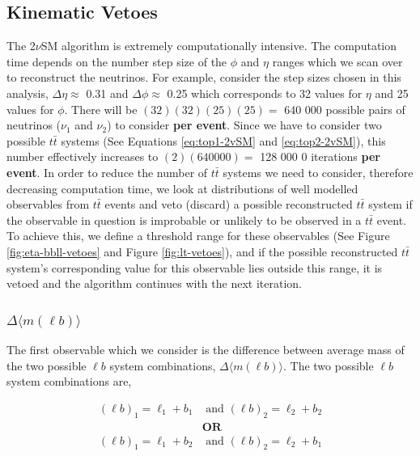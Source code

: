 \subsection{Kinematic Vetoes}
The 2$\nu$SM algorithm is extremely computationally intensive. The computation time depends on the number step size of the $\phi$ and $\eta$ ranges which we scan over to reconstruct the neutrinos. For example, consider the step sizes chosen in this analysis, $\Delta \eta \approx$ 0.31 and $\Delta \phi \approx$ 0.25 which corresponds to 32 values for $\eta$ and 25 values for $\phi$. There will be $(32)(32)(25)(25) = $ 640 000 possible pairs of neutrinos ($\nu_{1}$ and $\nu_{2}$) to consider \textbf{per event}. Since we have to consider two possible $t\bar{t}$ systems (See Equations \ref{eq:top1-2vSM} and \ref{eq:top2-2vSM}), this number effectively increases to $(2)(640000) = $ 128 000 0 iterations \textbf{per event}. In order to reduce the number of $t\bar{t}$ systems we need to consider, therefore decreasing computation time, we look at distributions of well modelled observables from $t\bar{t}$ events and veto (discard) a possible reconstructed $t\bar{t}$ system if the observable in question is improbable or unlikely to be observed in a $t\bar{t}$ event. To achieve this, we define a threshold range for these observables (See Figure \ref{fig:eta-bbll-vetoes} and Figure \ref{fig:lt-vetoes}), and if the possible reconstructed $t\bar{t}$ system's corresponding value for this observable lies outside this range, it is vetoed and the algorithm continues with the next iteration.

\subsubsection{$\Delta \langle m(\ell b)\rangle$}

The first observable which we consider is the difference between average mass of the two possible $\ell b$ system combinations, $\Delta \langle m(\ell b)\rangle$. The two possible $\ell b$ system combinations are,

\begin{align}
    (\ell b)_{1} = \ell_{1} + b_{1} &\text{ and }  (\ell b)_{2}  = \ell_{2} + b_{2} \\
    &\textbf{OR}\nonumber\\ 
     (\ell b)_{1} = \ell_{1} + b_{2} &\text{ and }  (\ell b)_{2}  = \ell_{2} + b_{1} \\
\end{align}

